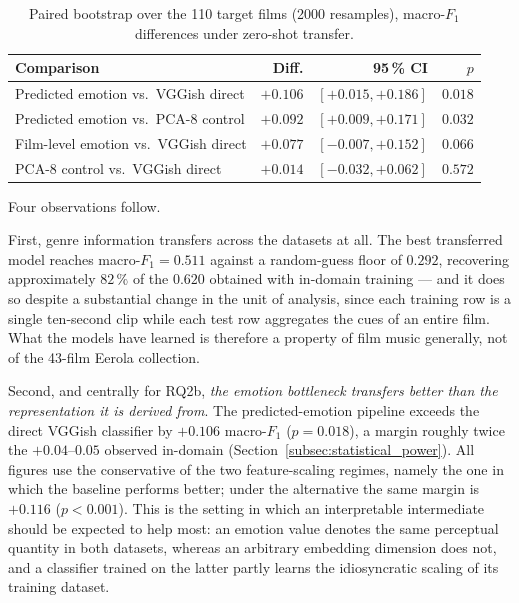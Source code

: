 \begin{table}[t]
  \centering
  \caption{Paired bootstrap over the 110 target films (2000 resamples), macro-$F_1$
    differences under zero-shot transfer.}
  \label{tab:zero_shot_bootstrap}
  \begin{tabular}{lrrr}
    \hline
    Comparison & Diff. & 95\,\% CI & $p$ \\
    \hline
    Predicted emotion vs.\ VGGish direct & $+0.106$ & $[+0.015, +0.186]$ & $\mathbf{0.018}$ \\
    Predicted emotion vs.\ PCA-8 control & $+0.092$ & $[+0.009, +0.171]$ & $\mathbf{0.032}$ \\
    Film-level emotion vs.\ VGGish direct & $+0.077$ & $[-0.007, +0.152]$ & $0.066$ \\
    PCA-8 control vs.\ VGGish direct     & $+0.014$ & $[-0.032, +0.062]$ & $0.572$ \\
    \hline
  \end{tabular}
\end{table}

Four observations follow.

First, genre information transfers across the datasets at all. The best transferred model
reaches macro-$F_1 = 0.511$ against a random-guess floor of $0.292$, recovering
approximately $82\,\%$ of the $0.620$ obtained with in-domain training --- and it does so
despite a substantial change in the unit of analysis, since each training row is a
single ten-second clip while each test row aggregates the cues of an entire film. What
the models have learned is therefore a property of film music generally, not of the
43-film Eerola collection.

Second, and centrally for RQ2b, \emph{the emotion bottleneck transfers better than the
representation it is derived from}. The predicted-emotion pipeline exceeds the direct
VGGish classifier by $+0.106$ macro-$F_1$ ($p = 0.018$), a margin roughly twice the
$+0.04$--$0.05$ observed in-domain (Section~\ref{subsec:statistical_power}). All figures use
the conservative of the two feature-scaling regimes, namely the one in which the baseline
performs better; under the alternative the same margin is $+0.116$ ($p<0.001$). This is the setting
in which an interpretable intermediate should be expected to help most: an emotion value
denotes the same perceptual quantity in both datasets, whereas an arbitrary embedding
dimension does not, and a classifier trained on the latter partly learns the idiosyncratic
scaling of its training dataset.

